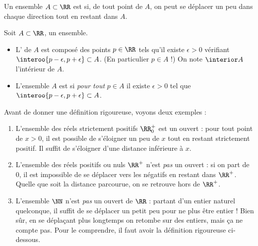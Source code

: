 \begin{frame}
  Un ensemble \(A \subset \RR\) est  si, de tout point de \(A\), on peut se déplacer un peu dans chaque direction tout en restant dans \(A\). \pause
  \begin{definition}
    Soit \(A \subset \RR\), un ensemble.
    \begin{itemize}
    \item L' de \(A\) est composé des points \(p \in \RR\) tels qu'il existe \(\epsilon > 0\) vérifiant \(\interoo{p-\epsilon,p+\epsilon}\subset A\). (En particulier \(p \in A\) !) On note \(\interior A\) l'intérieur de \(A\).%
    \item L'ensemble \(A\) est  si \emph{pour tout} \(p \in A\) il existe \(\epsilon > 0\) tel que \(\interoo{p-\epsilon,p+\epsilon}\subset A\).
    \end{itemize}
  \end{definition}
\end{frame}
\begin{frame}
  Avant de donner une définition rigoureuse, voyons deux exemples :
  \begin{example}
    \begin{enumerate}
    \item L'ensemble des réels strictement positifs \(\RR_{0}^+\) est un ouvert : pour tout point de \(x > 0\), il est possible de s'éloigner un peu de \(x\) tout en restant strictement positif. Il suffit de s'éloigner d'une distance inférieure à \(x\).
    \item L'ensemble des réels positifs ou nuls \(\RR^+\) n'est \emph{pas} un ouvert : si on part de \(0\), il est impossible de se déplacer \og vers les négatifs\fg{} en restant dans \(\RR^+\). Quelle que soit la distance parcourue, on se retrouve hors de \(\RR^+\).
    \item L'ensemble \(\NN\) n'est \emph{pas} un ouvert de \(\RR\) : partant d'un entier naturel quelconque, il suffit de se déplacer un petit peu pour ne plus être entier ! Bien sûr, en se déplaçant plus longtemps on retombe sur des entiers, mais ça \og ne compte pas\fg{}. Pour le comprendre, il faut avoir la définition rigoureuse ci-dessous.
    \end{enumerate}
  \end{example}
\end{frame}

